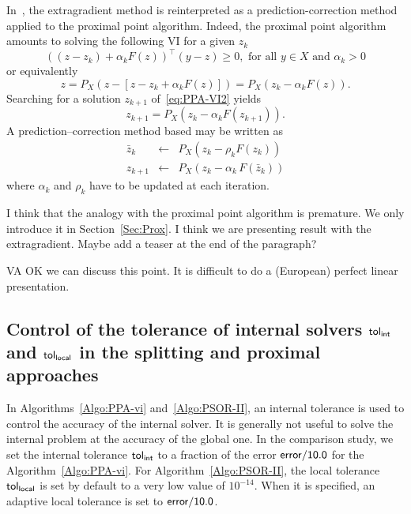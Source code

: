 In~\citep{He.Liao_JOTA2002}, the extragradient method is reinterpreted as a prediction-correction method applied to the proximal point algorithm. Indeed, the proximal point algorithm amounts to solving the following VI for a given $z_k$
\begin{equation}
  \label{eq:PPA-VI1}
  ((z-z_k)+ \alpha_k F(z))^\top(y-z) \geq 0, \text{ for all } y \in X \text{ and } \alpha_k >0
\end{equation}
or equivalently
\begin{equation}
  \label{eq:PPA-VI2}
  z = P_{X}(z - [z - z_k + \alpha_k F(z)]) = P_{X}( z_k - \alpha_k F(z)).
\end{equation}
Searching for a solution $z_{k+1}$ of~\eqref{eq:PPA-VI2} yields
\begin{equation}
  \label{eq:PPA-VI3}
  z_{k+1} = P_{X}( z_k - \alpha_k F(z_{k+1})).
\end{equation}
A prediction--correction method based may be written as
\begin{equation}
  \label{eq:PPA-VI4}
  \begin{array}{lcl}
    \bar z_{k} &\leftarrow& P_X(z_k-\rho_k F(z_k))\\
    z_{k+1} &\leftarrow& P_X(z_{k}-\alpha_k\,F(\bar z_k))
  \end{array}
\end{equation}
where  $\alpha_k$ and $\rho_k$ have to be updated at each iteration.
\begin{ndroh}
 I think that the analogy with the proximal point algorithm is premature. We only introduce it in Section~\ref{Sec:Prox}.\newline
I think we are presenting result with the extragradient. Maybe add a teaser at the end of the paragraph?

VA OK we can discuss this point. It is difficult to do a (European) perfect linear presentation.
\end{ndroh}

\subsection{Control of the tolerance of internal solvers $\sf tol_{{int}}$ and $\sf tol_{{local}}$ in the splitting and proximal approaches}
\label{Sec:NSGS-LocalTol}
In Algorithms~\ref{Algo:PPA-vi} and~\ref{Algo:PSOR-II}, an internal tolerance is used to control the accuracy of the internal solver. It is generally not useful to solve the internal problem at the accuracy of the global one. In the comparison study, we set the internal tolerance $\sf tol_{{int}}$ to a fraction of the error $\sf error/10.0$ for the Algorithm~\ref{Algo:PPA-vi}. For Algorithm~\ref{Algo:PSOR-II}, the local tolerance  $\sf tol_{{local}}$ is  set by default to a very low value of $10^{-14}$. When it is specified, an adaptive local tolerance is set to $\sf error/10.0$.

